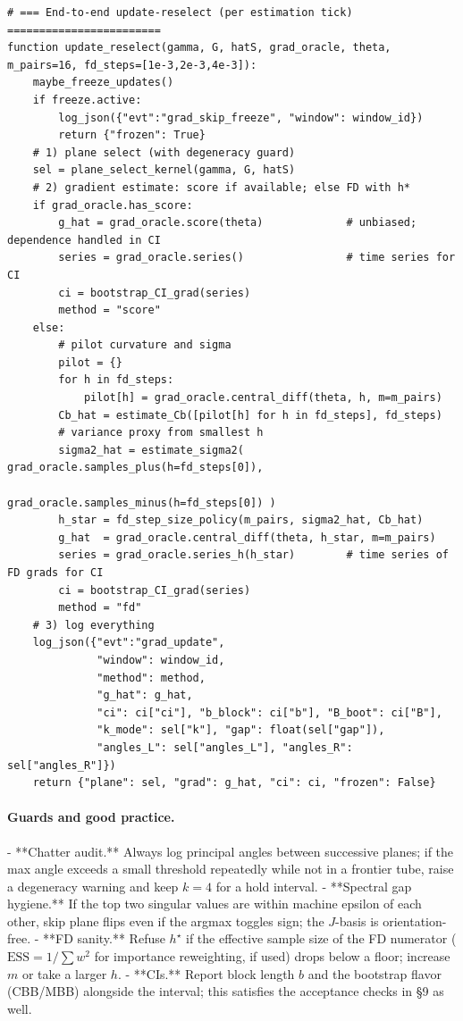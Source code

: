 \documentclass[10pt]{article}
\begin{document}
\begin{lstlisting}
# === End-to-end update-reselect (per estimation tick) ========================
function update_reselect(gamma, G, hatS, grad_oracle, theta, m_pairs=16, fd_steps=[1e-3,2e-3,4e-3]):
    maybe_freeze_updates()
    if freeze.active:
        log_json({"evt":"grad_skip_freeze", "window": window_id})
        return {"frozen": True}
    # 1) plane select (with degeneracy guard)
    sel = plane_select_kernel(gamma, G, hatS)
    # 2) gradient estimate: score if available; else FD with h*
    if grad_oracle.has_score:
        g_hat = grad_oracle.score(theta)             # unbiased; dependence handled in CI
        series = grad_oracle.series()                # time series for CI
        ci = bootstrap_CI_grad(series)
        method = "score"
    else:
        # pilot curvature and sigma
        pilot = {}
        for h in fd_steps:
            pilot[h] = grad_oracle.central_diff(theta, h, m=m_pairs)
        Cb_hat = estimate_Cb([pilot[h] for h in fd_steps], fd_steps)
        # variance proxy from smallest h
        sigma2_hat = estimate_sigma2( grad_oracle.samples_plus(h=fd_steps[0]),
                                      grad_oracle.samples_minus(h=fd_steps[0]) )
        h_star = fd_step_size_policy(m_pairs, sigma2_hat, Cb_hat)
        g_hat  = grad_oracle.central_diff(theta, h_star, m=m_pairs)
        series = grad_oracle.series_h(h_star)        # time series of FD grads for CI
        ci = bootstrap_CI_grad(series)
        method = "fd"
    # 3) log everything
    log_json({"evt":"grad_update",
              "window": window_id,
              "method": method,
              "g_hat": g_hat,
              "ci": ci["ci"], "b_block": ci["b"], "B_boot": ci["B"],
              "k_mode": sel["k"], "gap": float(sel["gap"]),
              "angles_L": sel["angles_L"], "angles_R": sel["angles_R"]})
    return {"plane": sel, "grad": g_hat, "ci": ci, "frozen": False}
\end{lstlisting}

\paragraph{Guards and good practice.}
- **Chatter audit.** Always log principal angles between successive planes; if the max angle exceeds a small threshold repeatedly while not in a frontier tube, raise a degeneracy warning and keep \(k\!\!=\!4\) for a hold interval.  
- **Spectral gap hygiene.** If the top two singular values are within machine epsilon of each other, skip plane flips even if the argmax toggles sign; the \(J\)-basis is orientation-free.  
- **FD sanity.** Refuse \(h^\star\) if the effective sample size of the FD numerator (\(\mathrm{ESS}=1/\sum w^2\) for importance reweighting, if used) drops below a floor; increase \(m\) or take a larger \(h\).  
- **CIs.** Report block length \(b\) and the bootstrap flavor (CBB/MBB) alongside the interval; this satisfies the acceptance checks in §9 as well.
\end{document}
